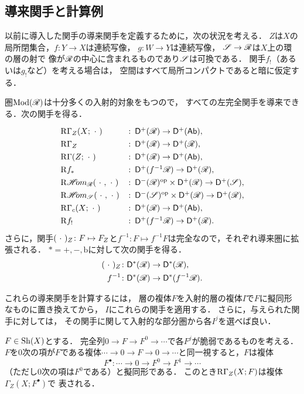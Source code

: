 \subsection*{導来関手と計算例}

以前に導入した関手の導来関手を定義するために，次の状況を考える．
\(Z\)は\(X\)の局所閉集合，\(f\colon Y\to X\)は連続写像，
\(g\colon W\to Y\)は連続写像，
\(\mathscr{S}\to\mathscr{R}\)は\(X\)上の環の層の射で
像が\(\mathscr{R}\)の中心に含まれるものであり\(\mathscr{S}\)は可換である．
関手\(f_{!}\)（あるいは\(g_{!}\)など）を考える場合は，
空間はすべて局所コンパクトであると暗に仮定する．

圏\(\mathop{\mathrm{Mod}}\nolimits(\mathscr{R})\)は十分多くの入射的対象をもつので，
すべての左完全関手を導来できる．次の関手を得る．
\[\def\arraystretch{1.3}
\begin{array}{ll}
    \RG_{Z}(X;\blk)         &\colon\Dompl(\scR)\to\Dompl(\cAb),\\
    \RG_{Z}                 &\colon\Dompl(\scR)\to\Dompl(\scR),\\
    \RG(Z;\blk)             &\colon\Dompl(\scR)\to\Dompl(\cAb),\\
    \Rder{f_{\ast}}         &\colon\Dompl(f^{-1}\scR)\to\Dompl(\scR),\\
    \RHOM_{\scR}(\blk,\blk) &\colon\Dompu(\scR)^{\op}\times\Dompl(\scR)\to\Dompl(\scS),\\
    \RHOM_{\scS}(\blk,\blk) &\colon\Dompu(\scS)^{\op}\times\Dompl(\scR)\to\Dompl(\scR),\\
    \RG_{c}(X;\blk)         &\colon\Dompl(\scR)\to\Dompl(\cAb),\\
    \Rder{f_{!}}            &\colon\Dompl(f^{-1}\scR)\to\Dompl(\scR).
\end{array}\]
さらに，関手\((\mathord{\ \cdot\ })_{Z}\colon F\mapsto F_Z\)と\(
    f^{-1}\colon F\mapsto f^{-1}F
\)は完全なので，それぞれ導来圏に拡張される．
\(\ast=+,-,\mathrm{b}\)に対して次の関手を得る．
\begin{align*}
    (\mathord{\ \cdot\ })_{Z}&\colon\mathsf{D}^{\ast}(\mathscr{R})\to\mathsf{D}^{\ast}(\mathscr{R}),\\
    f^{-1}&\colon \mathsf{D}^{\ast}(\mathscr{R})\to \mathsf{D}^{\ast}(f^{-1}\mathscr{R}).
\end{align*}

これらの導来関手を計算するには，
層の複体\(F\)を入射的層の複体\(I\)で\(F\)に擬同形なものに置き換えてから，
\(I\)にこれらの関手を適用する．
さらに，与えられた関手に対しては，
その関手に関して入射的な部分圏から各\(I^j\)を選べば良い．

\begin{EG}
    \(F\in\mathrm{Sh}(X)\)とする．
    完全列\(
        0\to F\to F^{0}\to\cdots
    \)で各\(F^{j}\)が脆弱であるものを考える．
    \(F\)を0次の項が\(F\)である複体\(
        \cdots\to0\to F\to 0\to\cdots
    \)と同一視すると，\(F\)は複体\[
        F^{\bullet}\colon\cdots\to0\to F^{0}\to F^{1}\to\cdots
    \]（ただし0次の項は\(F^{0}\)である）と擬同形である．
    このとき\(\mathop{\mathrm{R}\hspace{-0pt}\Gamma}\nolimits_{Z}(X;F)\)は複体\(\Gamma_{Z}(X;F^{\bullet})\)で
    表される．
\end{EG}

